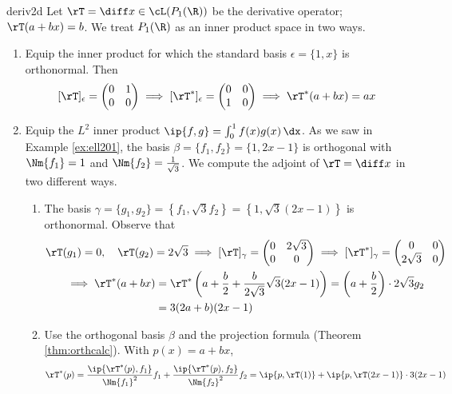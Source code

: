\begin{examples}{}{deriv2d}
Let $\rT=\diff x\in\cL(P_1(\R))$ be the derivative operator; $\rT(a+bx)=b$. We treat $P_1(\R)$ as an inner product space in two ways.
\begin{enumerate}
  \item Equip the inner product for which the standard basis $\epsilon=\{1,x\}$ is orthonormal. Then
  \[[\rT]_\epsilon=
  \begin{pmatrix}
  0&1\\0&0
  \end{pmatrix}
  \implies [\rT^*]_\epsilon=
  \begin{pmatrix}
  0&0\\1&0
  \end{pmatrix}
  \implies \rT^*(a+bx)=ax\]
  
  \item Equip the $L^2$ inner product $\ip{f,g}=\int_0^1f(x)g(x)\,\dx$. As we saw in Example \ref{ex:ell201}, the basis $\beta=\{f_1,f_2\}=\{1,2x-1\}$ is orthogonal with $\Nm{f_1}=1$ and $\Nm{f_2}=\frac 1{\sqrt 3}$. We compute the adjoint of $\rT=\diff x$ in two different ways.
  \begin{enumerate}
    \item The basis $\gamma=\{g_1,g_2\}=\left\{f_1,\sqrt 3f_2\right\}=\left\{1,\sqrt 3(2x-1)\right\}$ is orthonormal. Observe that
    \begin{gather*}
    \rT(g_1)=0,\quad \rT(g_2)=2\sqrt 3\implies [\rT]_\gamma=\begin{pmatrix}
    0&2\sqrt 3\\
    0&0
    \end{pmatrix}\implies [\rT^*]_\gamma=\begin{pmatrix}
    0&0\\
    2\sqrt 3&0
    \end{pmatrix}\\
    \begin{aligned}
    \implies \rT^*(a+bx)&=\rT^*\left(a+\frac b2+\frac b{2\sqrt 3}\sqrt 3(2x-1)\right) =\left(a+\frac b2\right)\cdot 2\sqrt 3g_2\\
    &=3(2a+b)(2x-1)
    \end{aligned}
    \end{gather*}
    \item Use the orthogonal basis $\beta$ and the projection formula (Theorem \ref{thm:orthcalc}). With $p(x)=a+bx$,
		\begin{align*}
		\rT^*(p)&=\frac{\ip{\rT^*(p),f_1}}{\Nm{f_1}^2}f_1 +\frac{\ip{\rT^*(p),f_2}}{\Nm{f_2}^2}f_2 =\ip{p,\rT(1)} +\ip{p,\rT(2x-1)}\cdot 3(2x-1)\\

\end{align*}
\end{enumerate}
\end{enumerate}
\end{examples}
